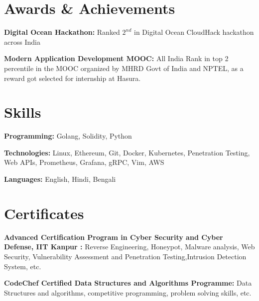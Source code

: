 \documentclass[letterpaper,11pt]{article}
\newcommand{\resumeSubHeadingListStart}{\begin{itemize}[leftmargin=0.15in, label={}]}
\newcommand{\resumeSubHeadingListEnd}{\end{itemize}}
\begin{document}
\section{Awards \& Achievements}
  \vspace{2pt}
  \resumeSubHeadingListStart
    \small{\item{
        \textbf{Digital Ocean Hackathon: }{ Ranked $2^{nd}$ in Digital Ocean CloudHack hackathon across India} \\ \vspace{3pt}
        
        \textbf{Modern Application Development MOOC: }{All India Rank in top 2 percentile in the MOOC organized by MHRD Govt of India and NPTEL, as a reward got selected for internship at Hasura.} \\ \vspace{3pt}
        
    }}
  \resumeSubHeadingListEnd



\section{Skills}
  \vspace{2pt}
  \resumeSubHeadingListStart
    \small{\item{
        \textbf{Programming:}{ Golang, Solidity, Python } \\ \vspace{3pt}
        
        \textbf{Technologies:}{ Linux, Ethereum, Git, Docker, Kubernetes, Penetration Testing, Web APIs, Prometheus, Grafana, gRPC, Vim, AWS} \\ \vspace{3pt}
        
        \textbf{Languages:}{ English, Hindi, Bengali }
    }}
  \resumeSubHeadingListEnd


\section{Certificates}
  \resumeSubHeadingListStart
	\small{\item{
        \textbf{Advanced Certification Program in Cyber Security and Cyber Defense, IIT Kanpur : }{Reverse Engineering, Honeypot, Malware analysis, Web Security, Vulnerability Assessment and Penetration Testing,Intrusion Detection System, etc.} \\ \vspace{3pt}
        
        \textbf{CodeChef Certified Data Structures and Algorithms Programme: }{Data Structures and algorithms, competitive programming, problem solving skills, etc. }
    }}
  \resumeSubHeadingListEnd
\end{document}
